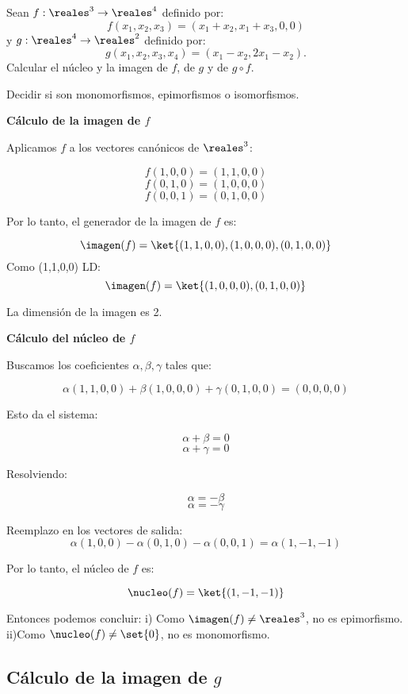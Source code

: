 \begin{enunciado}{\ejercicio}
  Sean $ f: \reales^3 \to \reales^4 $ definido por:
  $$
    f(x_1, x_2, x_3) = (x_1 + x_2, x_1 + x_3, 0, 0)
  $$
  y $ g: \reales^4 \to \reales^2 $ definido por:
  $$
    g(x_1, x_2, x_3, x_4) = (x_1 - x_2, 2x_1 - x_2).
  $$
  Calcular el núcleo y la imagen de $f$, de $g$ y de $g \circ f$.

  Decidir si son monomorfismos, epimorfismos o isomorfismos.
\end{enunciado}

\medskip

\textbf{Cálculo de la imagen de $f$}

Aplicamos $f$ a los vectores canónicos de $\reales^3$:

$$ f(1,0,0) = (1,1,0,0) $$
$$ f(0,1,0) = (1,0,0,0) $$
$$ f(0,0,1) = (0,1,0,0) $$

Por lo tanto, el generador de la imagen de $ f $ es:

$$ \imagen(f) = \ket{(1,1,0,0), (1,0,0,0), (0,1,0,0)} $$
Como (1,1,0,0) LD:
$$ \imagen(f) = \ket{(1,0,0,0), (0,1,0,0)} $$

La dimensión de la imagen es 2.

\medskip

\textbf{Cálculo del núcleo de $ f $}

Buscamos los coeficientes $ \alpha, \beta, \gamma $ tales que:

$$ \alpha(1,1,0,0) + \beta(1,0,0,0) + \gamma(0,1,0,0) = (0,0,0,0) $$

Esto da el sistema:

$$ \alpha + \beta = 0 $$
$$ \alpha + \gamma = 0 $$

Resolviendo:

$$ \alpha = -\beta $$
$$ \alpha = -\gamma $$

Reemplazo en los vectores de salida:
$$ \alpha(1,0,0) - \alpha(0,1,0) - \alpha(0,0,1) = \alpha(1,-1,-1) $$

Por lo tanto, el núcleo de $ f $ es:

$$ \nucleo(f) = \ket{(1,-1,-1)} $$

Entonces podemos concluir:
\newline
i) Como $ \imagen(f) \neq \reales^3 $, no es epimorfismo.
\newline
ii)Como $ \nucleo(f) \neq \set{0} $, no es monomorfismo.

\subsection*{Cálculo de la imagen de $ g $}

